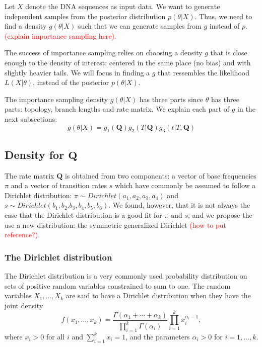 \documentclass[useAMS,usenatbib]{biom}
\newcommand{\falta}[1]{\textcolor{red}{#1}}
\begin{document}
Let $X$ denote the DNA sequences as input data. We want to generate
independent samples from the posterior distribution
$p(\theta|X)$. Thus, we need to find a density $g(\theta|X)$ such that
we can generate samples from $g$ instead of $p$. \falta{(explain
  importance sampling here).}

The success of importance sampling relies on choosing a density $g$
that is close enough to the density of interest: centered in the same
place (no bias) and with slightly heavier tails. We will focus in
finding a $g$ that ressembles the likelihood $L(X|\theta)$, instead of
the posterior $p(\theta|X)$.

The importance sampling density $g(\theta|X)$ has three parts since
$\theta$ has three parts: topology, branch lengths and rate matrix. We
explain each part of $g$ in the next subsections:
\begin{equation}
g(\theta|X) = g_1(\mathbf{Q})g_2(T|\mathbf{Q})g_3(t|T,\mathbf{Q})
\end{equation}

\subsection{Density for $\mathbf{Q}$}
The rate matrix $\mathbf{Q}$ is obtained from two components: a vector
of base frequencies $\pi$ and a vector of transition rates $s$ which
have commonly be assumed to follow a Dirichlet distribution: $\pi\sim
Dirichlet(a_1,a_2,a_3,a_4)$ and $s\sim
Dirichlet(b_1,b_2.b_3,b_4,b_5,b_6)$.
We found, however, that it is not always the case that the Dirichlet
distribution is a good fit for $\pi$ and $s$, and we propose the use a
new distribution: the symmetric generalized Dirichlet \falta{(how to
  put reference?)}.

\subsubsection{The Dirichlet distribution}
The Dirichlet distribution is a very commonly used probability distribution
on sets of positive random variables constrained to sum to one.
The random variables $X_1,\ldots,X_k$ are said to have a Dirichlet distribution
when they have the joint density
\begin{equation}
  f(x_1,\ldots,x_k) = \frac{\Gamma(\alpha_1 + \cdots + \alpha_k)}{\prod_{i=1}^k \Gamma(\alpha_i)} \prod_{i=1}^k x_i^{\alpha_i - 1},
\end{equation}
where $x_i > 0$ for all $i$ and $\sum_{i=1}^k x_i = 1$, and the
parameters $\alpha_i > 0$ for $i=1,\ldots,k$.
\end{document}

